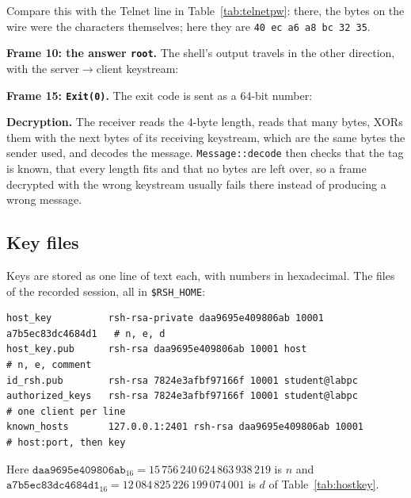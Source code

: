 Compare this with the Telnet line in Table~\ref{tab:telnetpw}: there, the
bytes on the wire were the characters themselves; here they are
\texttt{40 ec a6 a8 bc 32 35}.

\textbf{Frame 10: the answer \texttt{root}.} The shell's output travels in the
other direction, with the server$\to$client keystream:

\begin{table}[H]
\centering

\caption{Encryption of the shell's output \texttt{root}.}
\end{table}

\textbf{Frame 15: \texttt{Exit(0)}.} The exit code is sent as a 64-bit number:

\begin{table}[H]
\centering

\caption{Encryption of the shell's exit code.}
\end{table}

\textbf{Decryption.} The receiver reads the 4-byte length, reads that many
bytes, XORs them with the next bytes of its receiving keystream, which are the
same bytes the sender used, and decodes the message. \texttt{Message::decode}
then checks that the tag is known, that every length fits and that no bytes are
left over, so a frame decrypted with the wrong keystream usually fails there
instead of producing a wrong message.

\subsection{Key files}

Keys are stored as one line of text each, with numbers in hexadecimal. The
files of the recorded session, all in \texttt{\$RSH\_HOME}:

\begin{lstlisting}[style=plain]
host_key          rsh-rsa-private daa9695e409806ab 10001 a7b5ec83dc4684d1   # n, e, d
host_key.pub      rsh-rsa daa9695e409806ab 10001 host                       # n, e, comment
id_rsh.pub        rsh-rsa 7824e3afbf97166f 10001 student@labpc
authorized_keys   rsh-rsa 7824e3afbf97166f 10001 student@labpc              # one client per line
known_hosts       127.0.0.1:2401 rsh-rsa daa9695e409806ab 10001             # host:port, then key
\end{lstlisting}

\noindent Here $\texttt{daa9695e409806ab}_{16} = 15\,756\,240\,624\,863\,938\,219$
is $n$ and $\texttt{a7b5ec83dc4684d1}_{16} = 12\,084\,825\,226\,199\,074\,001$
is $d$ of Table~\ref{tab:hostkey}.

